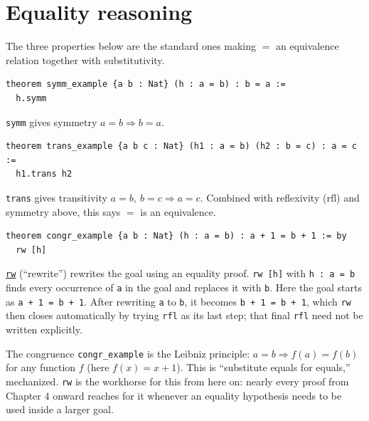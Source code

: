 \section{Equality reasoning}\label{sec:03-propositions-and-proofs:07-equality:1}

The three properties below are the standard ones making \(=\) an equivalence relation together with substitutivity.

\begin{lstlisting}
theorem symm_example {a b : Nat} (h : a = b) : b = a :=
  h.symm
\end{lstlisting}

\texttt{symm} gives symmetry \(a = b \Rightarrow b = a\).

\begin{lstlisting}
theorem trans_example {a b c : Nat} (h1 : a = b) (h2 : b = c) : a = c :=
  h1.trans h2
\end{lstlisting}

\texttt{trans} gives transitivity \(a = b,\ b = c \Rightarrow a = c\). Combined with reflexivity (\(\mathrm{rfl}\)) and symmetry above, this says \(=\) is an equivalence.

\begin{lstlisting}
theorem congr_example {a b : Nat} (h : a = b) : a + 1 = b + 1 := by
  rw [h]
\end{lstlisting}

\href{https://lean-lang.org/doc/reference/latest/Tactic-Proofs/Tactic-Reference/}{\texttt{rw}} (``rewrite'') rewrites the goal using an equality proof. \texttt{rw [h]} with \texttt{h : a = b} finds every occurrence of \texttt{a} in the goal and replaces it with \texttt{b}. Here the goal starts as \texttt{a + 1 = b + 1}. After rewriting \texttt{a} to \texttt{b}, it becomes \texttt{b + 1 = b + 1}, which \texttt{rw} then closes automatically by trying \texttt{rfl} as its last step; that final \texttt{rfl} need not be written explicitly.

The congruence \texttt{congr\_\allowbreak{}example} is the Leibniz principle: \(a = b \Rightarrow
f(a) = f(b)\) for any function \(f\) (here \(f(x) = x + 1\)). This is ``substitute equals for equals,'' mechanized. \texttt{rw} is the workhorse for this from here on: nearly every proof from Chapter 4 onward reaches for it whenever an equality hypothesis needs to be used inside a larger goal.
